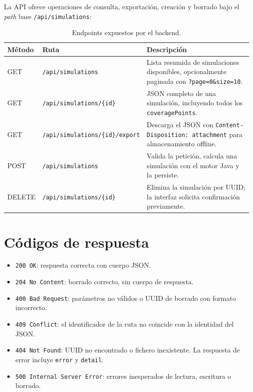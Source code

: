 La API ofrece operaciones de consulta, exportación, creación y borrado bajo el
\textit{path} base \texttt{/api/simulations}:

\begin{table}[h!]
\centering
\caption{Endpoints expuestos por el backend.}
\label{tab:api_endpoints}
\small
\begin{tabular}{|l|l|p{6.5cm}|}
\hline
\textbf{Método} & \textbf{Ruta} & \textbf{Descripción} \\
\hline
GET & \texttt{/api/simulations}                & Lista resumida de simulaciones disponibles, opcionalmente paginada con \texttt{?page=0\&size=10}. \\
GET & \texttt{/api/simulations/\{id\}}         & JSON completo de una simulación, incluyendo todos los \texttt{coveragePoints}. \\
GET & \texttt{/api/simulations/\{id\}/export}  & Descarga el JSON con \texttt{Content-Disposition: attachment} para almacenamiento offline. \\
POST & \texttt{/api/simulations}              & Valida la petición, calcula una simulación con el motor Java y la persiste. \\
DELETE & \texttt{/api/simulations/\{id\}}      & Elimina la simulación por UUID; la interfaz solicita confirmación previamente. \\
\hline
\end{tabular}
\end{table}

\section{Códigos de respuesta}

\begin{itemize}
\item \texttt{200~OK}: respuesta correcta con cuerpo JSON.
\item \texttt{204~No Content}: borrado correcto, sin cuerpo de respuesta.
\item \texttt{400~Bad Request}: parámetros no válidos o UUID de borrado con formato incorrecto.
\item \texttt{409~Conflict}: el identificador de la ruta no coincide con la identidad del JSON.
\item \texttt{404~Not Found}: UUID no encontrado o fichero inexistente. La
  respuesta de error incluye \texttt{error} y \texttt{detail}.
\item \texttt{500~Internal Server Error}: errores inesperados de lectura, escritura o borrado.
\end{itemize}

